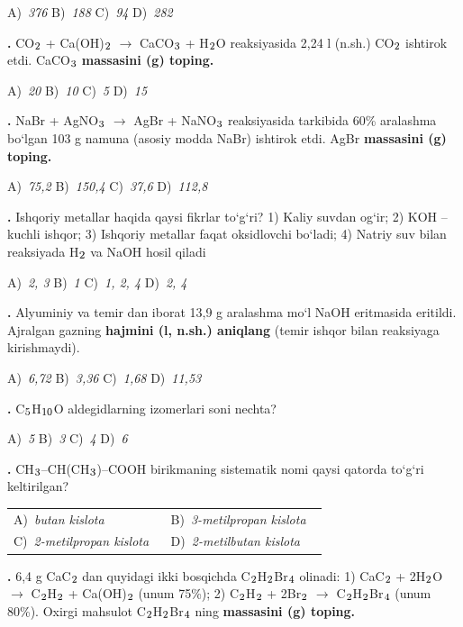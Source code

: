 \documentclass[11pt,a4paper]{article}
\renewcommand{\textsubscript}[1]{\ensuremath{_{\text{\fontsize{8}{8}\selectfont #1}}}}
\newcommand{\qn}[1]{\textbf{\fontsize{11.5}{13}\selectfont #1}}
\newcommand{\qsep}{\par\vspace{1pt}\noindent\rule{0pt}{0.4pt}\par\vspace{5pt}}
\begin{document}
\begin{multicols}{2}
\noindent A)~\textsl{376} \hfill B)~\textsl{188} \hfill C)~\textsl{94} \hfill D)~\textsl{282}\par
\qsep
\noindent\qn{16.} CO\textsubscript{2} + Ca(OH)\textsubscript{2} $\to$ CaCO\textsubscript{3} + H\textsubscript{2}O reaksiyasida 2,24 l (n.sh.) CO\textsubscript{2} ishtirok etdi. CaCO\textsubscript{3} \textbf{massasini (g) toping.}

\noindent A)~\textsl{20} \hfill B)~\textsl{10} \hfill C)~\textsl{5} \hfill D)~\textsl{15}\par
\qsep
\noindent\qn{17.} NaBr + AgNO\textsubscript{3} $\to$ AgBr + NaNO\textsubscript{3} reaksiyasida tarkibida 60\% aralashma bo`lgan 103 g namuna (asosiy modda NaBr) ishtirok etdi. AgBr \textbf{massasini (g) toping.}

\noindent A)~\textsl{75,2} \hfill B)~\textsl{150,4} \hfill C)~\textsl{37,6} \hfill D)~\textsl{112,8}\par
\qsep
\noindent\qn{18.} Ishqoriy metallar haqida qaysi fikrlar to`g`ri? 1) Kaliy suvdan og`ir; 2) KOH -- kuchli ishqor; 3) Ishqoriy metallar faqat oksidlovchi bo`ladi; 4) Natriy suv bilan reaksiyada H\textsubscript{2} va NaOH hosil qiladi

\noindent A)~\textsl{2, 3} \hfill B)~\textsl{1} \hfill C)~\textsl{1, 2, 4} \hfill D)~\textsl{2, 4}\par
\qsep
\noindent\qn{19.} Alyuminiy va temir dan iborat 13,9 g aralashma mo`l NaOH eritmasida eritildi. Ajralgan gazning \textbf{hajmini (l, n.sh.) aniqlang} (temir ishqor bilan reaksiyaga kirishmaydi).

\noindent A)~\textsl{6,72} \hfill B)~\textsl{3,36} \hfill C)~\textsl{1,68} \hfill D)~\textsl{11,53}\par
\qsep
\noindent\qn{20.} C\textsubscript{5}H\textsubscript{10}O aldegidlarning izomerlari soni nechta?

\noindent A)~\textsl{5} \hfill B)~\textsl{3} \hfill C)~\textsl{4} \hfill D)~\textsl{6}\par
\qsep
\noindent\qn{21.} CH\textsubscript{3}--CH(CH\textsubscript{3})--COOH birikmaning sistematik nomi qaysi qatorda to`g`ri keltirilgan?

\noindent\begin{tabular}{@{}p{0.47\linewidth}@{}p{0.47\linewidth}@{}}
A)~\textsl{butan kislota} & B)~\textsl{3-metilpropan kislota} \\
C)~\textsl{2-metilpropan kislota} & D)~\textsl{2-metilbutan kislota} \\
\end{tabular}\par
\qsep
\noindent\qn{22.} 6,4 g CaC\textsubscript{2} dan quyidagi ikki bosqichda C\textsubscript{2}H\textsubscript{2}Br\textsubscript{4} olinadi: 1) CaC\textsubscript{2} + 2H\textsubscript{2}O $\to$ C\textsubscript{2}H\textsubscript{2} + Ca(OH)\textsubscript{2} (unum 75\%); 2) C\textsubscript{2}H\textsubscript{2} + 2Br\textsubscript{2} $\to$ C\textsubscript{2}H\textsubscript{2}Br\textsubscript{4} (unum 80\%). Oxirgi mahsulot C\textsubscript{2}H\textsubscript{2}Br\textsubscript{4} ning \textbf{massasini (g) toping.}


\end{multicols}
\end{document}
